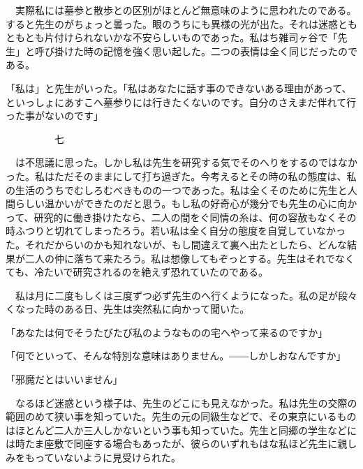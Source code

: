 \documentclass[a4j,onecolumn]{tarticle}
\begin{document}
　実際私には墓参と散歩との区別がほとんど無意味のように思われたのである。\hbox{}すると先生のがちょっと曇った。\hbox{}眼のうちにも異様の光が出た。\hbox{}それは迷惑ともともとも片付けられないかな不安らしいものであった。\hbox{}私はち雑司ヶ谷で「先生」と呼び掛けた時の記憶を強く思い起した。\hbox{}二つの表情は全く同じだったのである。\hbox{}\par{}
「私は」と先生がいった。\hbox{}「私はあなたに話す事のできないある理由があって、\hbox{}といっしょにあすこへ墓参りには行きたくないのです。\hbox{}自分のさえまだ伴れて行った事がないのです」\par{}\par{}　　　　　七
\par{}
　は不思議に思った。\hbox{}しかし私は先生を研究する気でそのへりをするのではなかった。\hbox{}私はただそのままにして打ち過ぎた。\hbox{}今考えるとその時の私の態度は、\hbox{}私の生活のうちでむしろむべきものの一つであった。\hbox{}私は全くそのために先生と人間らしい温かいができたのだと思う。\hbox{}もし私の好奇心が幾分でも先生の心に向かって、\hbox{}研究的に働き掛けたなら、\hbox{}二人の間をぐ同情の糸は、\hbox{}何の容赦もなくその時ふつりと切れてしまったろう。\hbox{}若い私は全く自分の態度を自覚していなかった。\hbox{}それだからいのかも知れないが、\hbox{}もし間違えて裏へ出たとしたら、\hbox{}どんな結果が二人の仲に落ちて来たろう。\hbox{}私は想像してもぞっとする。\hbox{}先生はそれでなくても、\hbox{}冷たいで研究されるのを絶えず恐れていたのである。\hbox{}\par{}
　私は月に二度もしくは三度ずつ必ず先生のへ行くようになった。\hbox{}私の足が段々くなった時のある日、\hbox{}先生は突然私に向かって聞いた。\hbox{}\par{}
「あなたは何でそうたびたび私のようなものの宅へやって来るのですか」\par{}
「何でといって、\hbox{}そんな特別な意味はありません。\hbox{}――しかしおなんですか」\par{}
「邪魔だとはいいません」\par{}
　なるほど迷惑という様子は、\hbox{}先生のどこにも見えなかった。\hbox{}私は先生の交際の範囲のめて狭い事を知っていた。\hbox{}先生の元の同級生などで、\hbox{}その東京にいるものはほとんど二人か三人しかないという事も知っていた。\hbox{}先生と同郷の学生などには時たま座敷で同座する場合もあったが、\hbox{}彼らのいずれもはな私ほど先生に親しみをもっていないように見受けられた。\hbox{}\par{}
\end{document}
